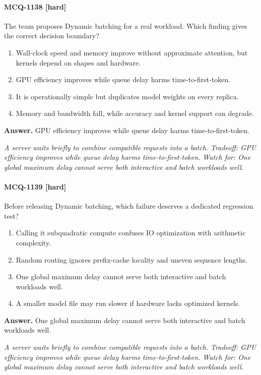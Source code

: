 \paragraph{MCQ-1138 [hard]} The team proposes Dynamic batching for a real workload. Which finding gives the correct decision boundary?
\begin{enumerate}[label=\Alph*.]
\item Wall-clock speed and memory improve without approximate attention, but kernels depend on shapes and hardware.
\item GPU efficiency improves while queue delay harms time-to-first-token.
\item It is operationally simple but duplicates model weights on every replica.
\item Memory and bandwidth fall, while accuracy and kernel support can degrade.
\end{enumerate}
\noindent\textbf{Answer.} GPU efficiency improves while queue delay harms time-to-first-token.
\par\textit{A server waits briefly to combine compatible requests into a batch. Tradeoff: GPU efficiency improves while queue delay harms time-to-first-token. Watch for: One global maximum delay cannot serve both interactive and batch workloads well.}
\paragraph{MCQ-1139 [hard]} Before releasing Dynamic batching, which failure deserves a dedicated regression test?
\begin{enumerate}[label=\Alph*.]
\item Calling it subquadratic compute confuses IO optimization with arithmetic complexity.
\item Random routing ignores prefix-cache locality and uneven sequence lengths.
\item One global maximum delay cannot serve both interactive and batch workloads well.
\item A smaller model file may run slower if hardware lacks optimized kernels.
\end{enumerate}
\noindent\textbf{Answer.} One global maximum delay cannot serve both interactive and batch workloads well.
\par\textit{A server waits briefly to combine compatible requests into a batch. Tradeoff: GPU efficiency improves while queue delay harms time-to-first-token. Watch for: One global maximum delay cannot serve both interactive and batch workloads well.}
